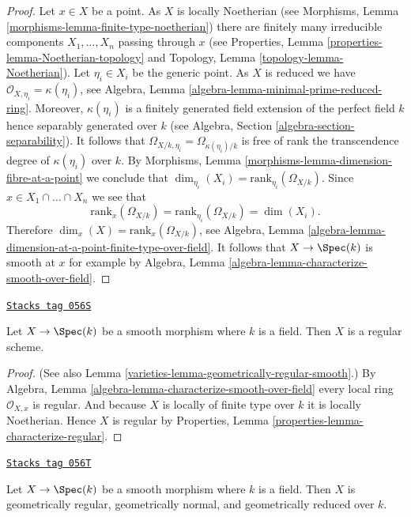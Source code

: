 \begin{proof}
Let $x \in X$ be a point. As $X$ is locally Noetherian (see
Morphisms, Lemma \ref{morphisms-lemma-finite-type-noetherian})
there are finitely many irreducible components
$X_1, \ldots, X_n$ passing through $x$ (see
Properties, Lemma \ref{properties-lemma-Noetherian-topology} and
Topology, Lemma \ref{topology-lemma-Noetherian}).
Let $\eta_i \in X_i$ be the generic point. As $X$ is reduced we have
$\mathcal{O}_{X, \eta_i} = \kappa(\eta_i)$, see
Algebra, Lemma \ref{algebra-lemma-minimal-prime-reduced-ring}.
Moreover, $\kappa(\eta_i)$ is a finitely generated field extension
of the perfect field $k$ hence separably generated over $k$ (see
Algebra, Section \ref{algebra-section-separability}).
It follows that $\Omega_{X/k, \eta_i} = \Omega_{\kappa(\eta_i)/k}$
is free of rank the transcendence degree of $\kappa(\eta_i)$ over $k$. By
Morphisms, Lemma \ref{morphisms-lemma-dimension-fibre-at-a-point}
we conclude that $\dim_{\eta_i}(X_i) = \text{rank}_{\eta_i}(\Omega_{X/k})$.
Since $x \in X_1 \cap \ldots \cap X_n$ we see that
$$
\text{rank}_x(\Omega_{X/k}) = \text{rank}_{\eta_i}(\Omega_{X/k}) = \dim(X_i).
$$
Therefore $\dim_x(X) = \text{rank}_x(\Omega_{X/k})$, see
Algebra, Lemma \ref{algebra-lemma-dimension-at-a-point-finite-type-over-field}.
It follows that $X \to \Spec(k)$ is smooth at $x$ for example by
Algebra, Lemma \ref{algebra-lemma-characterize-smooth-over-field}.
\end{proof}

\begin{lemma}
\label{varieties-lemma-smooth-regular}
\href{https://stacks.math.columbia.edu/tag/056S}{\texttt{Stacks tag 056S}}


Let $X \to \Spec(k)$ be a smooth morphism where $k$ is a field.
Then $X$ is a regular scheme.
\end{lemma}

\begin{proof}

(See also
Lemma \ref{varieties-lemma-geometrically-regular-smooth}.)
By
Algebra, Lemma \ref{algebra-lemma-characterize-smooth-over-field}
every local ring $\mathcal{O}_{X, x}$ is regular.
And because $X$ is locally of finite type over $k$ it is locally
Noetherian. Hence $X$ is regular by
Properties, Lemma \ref{properties-lemma-characterize-regular}.
\end{proof}

\begin{lemma}
\label{varieties-lemma-smooth-geometrically-normal}
\href{https://stacks.math.columbia.edu/tag/056T}{\texttt{Stacks tag 056T}}

Let $X \to \Spec(k)$ be a smooth morphism where $k$ is a field.
Then $X$ is geometrically regular, geometrically normal, and
geometrically reduced over $k$.
\end{lemma}

